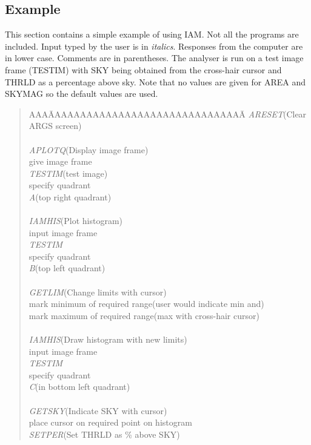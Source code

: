 \subsection {Example}
This section contains a simple example of using IAM.
Not all the programs are included.
Input typed by the user is in {\em italics}.
Responses from the computer are in lower case.
Comments are in parentheses.
The analyser is run on a test image frame (TESTIM) with SKY being obtained from
the cross-hair cursor and THRLD as a percentage above sky.
Note that no values are given for AREA and SKYMAG so the default values are
used.
\begin{quote}
\begin{tabbing}
AAA\=AAAAAAAAAAAAAAAAAAAAAAAAAAAAAAA\=\kill
{\em ARESET}\>\>(Clear ARGS screen)\\
\\
{\em APLOTQ}\>\>(Display image frame)\\
\>give image frame\\
{\em TESTIM}\>\>(test image)\\
\>specify quadrant\\
{\em A}\>\>(top right quadrant)\\
\\
{\em IAMHIS}\>\>(Plot histogram)\\
\>input image frame\\
{\em TESTIM}\\
\>specify quadrant\\
{\em B}\>\>(top left quadrant)\\
\\
{\em GETLIM}\>\>(Change limits with cursor)\\
\>mark minimum of required range\>(user would indicate min and)\\
\>mark maximum of required range\>(max with cross-hair cursor)\\
\\
{\em IAMHIS}\>\>(Draw histogram with new limits)\\
\>input image frame\\
{\em TESTIM}\\
\>specify quadrant\\
{\em C}\>\>(in bottom left quadrant)\\
\\
{\em GETSKY}\>\>(Indicate SKY with cursor)\\
\>place cursor on required point on histogram\\
{\em SETPER}\>\>(Set THRLD as \% above SKY)\\

\end{tabbing}
\end{quote}
